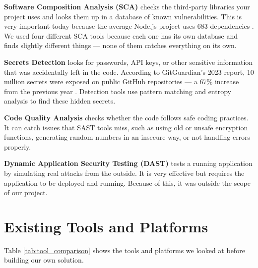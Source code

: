 \documentclass[12pt,a4paper]{report}
\begin{document}
\textbf{Software Composition Analysis (SCA)} checks the third-party libraries your project uses and looks them up in a database of known vulnerabilities. This is very important today because the average Node.js project uses 683 dependencies \cite{synopsys2023}. We used four different SCA tools because each one has its own database and finds slightly different things --- none of them catches everything on its own.

\textbf{Secrets Detection} looks for passwords, API keys, or other sensitive information that was accidentally left in the code. According to GitGuardian's 2023 report, 10 million secrets were exposed on public GitHub repositories --- a 67\% increase from the previous year \cite{gitguardian2023}. Detection tools use pattern matching and entropy analysis to find these hidden secrets.

\textbf{Code Quality Analysis} checks whether the code follows safe coding practices. It can catch issues that SAST tools miss, such as using old or unsafe encryption functions, generating random numbers in an insecure way, or not handling errors properly.

\textbf{Dynamic Application Security Testing (DAST)} tests a running application by simulating real attacks from the outside. It is very effective but requires the application to be deployed and running. Because of this, it was outside the scope of our project.

\section{Existing Tools and Platforms}

Table \ref{tab:tool_comparison} shows the tools and platforms we looked at before building our own solution.
\end{document}
